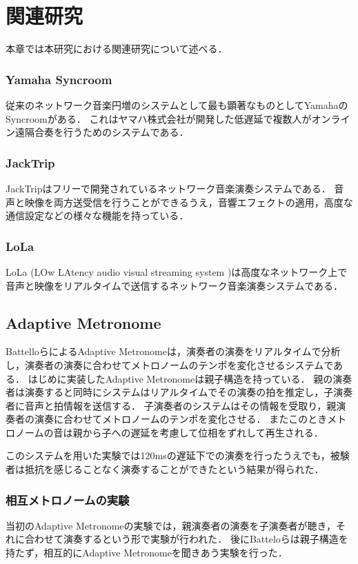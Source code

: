 \chapter{関連研究}
\label{related}

本章では本研究における関連研究について述べる．

\subsection{Yamaha Syncroom}
従来のネットワーク音楽円増のシステムとして最も顕著なものとしてYamahaのSyncroomがある．
これはヤマハ株式会社が開発した低遅延で複数人がオンライン遠隔合奏を行うためのシステムである．

\subsection{JackTrip}
JackTripはフリーで開発されているネットワーク音楽演奏システムである．
音声と映像を両方送受信を行うことができるうえ，音響エフェクトの適用，高度な通信設定などの様々な機能を持っている．

\subsection{LoLa}
LoLa (LOw LAtency audio visual streaming system )は高度なネットワーク上で音声と映像をリアルタイムで送信するネットワーク音楽演奏システムである．

\section{Adaptive Metronome}
BattelloらによるAdaptive Metronome\cite{admet}\cite{admet:experiment}は，演奏者の演奏をリアルタイムで分析し，演奏者の演奏に合わせてメトロノームのテンポを変化させるシステムである．
はじめに実装したAdaptive Metronomeは親子構造を持っている．
親の演奏者は演奏すると同時にシステムはリアルタイムでその演奏の拍を推定し，子演奏者に音声と拍情報を送信する．
子演奏者のシステムはその情報を受取り，親演奏者の演奏に合わせてメトロノームのテンポを変化させる．
またこのときメトロノームの音は親から子への遅延を考慮して位相をずれして再生される．

このシステムを用いた実験では120msの遅延下での演奏を行ったうえでも，被験者は抵抗を感じることなく演奏することができたという結果が得られた．\cite{admet}

\subsection{相互メトロノームの実験}
当初のAdaptive Metronomeの実験では，親演奏者の演奏を子演奏者が聴き，それに合わせて演奏するという形で実験が行われた．
後にBatteloらは親子構造を持たず，相互的にAdaptive Metronomeを聞きあう実験を行った．


